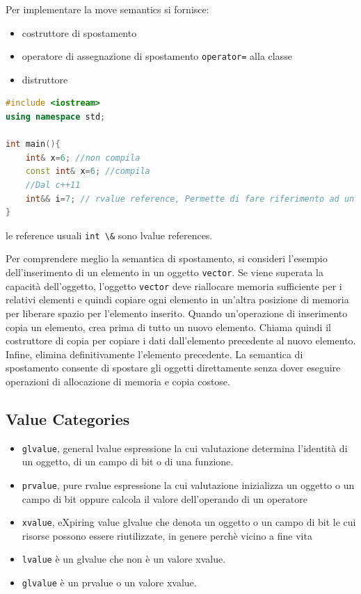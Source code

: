 Per implementare la move semantics si fornisce:
\begin{itemize}
    \item costruttore di spostamento
    \item operatore di assegnazione di spostamento \verb|operator=| alla classe
    \item distruttore
\end{itemize}

\begin{lstlisting}[language=C++]
#include <iostream>
using namespace std;

int main(){
    int& x=6; //non compila
    const int& x=6; //compila
    //Dal c++11
    int&& i=7; // rvalue reference, Permette di fare riferimento ad un rvalue e di modificarlo
}
\end{lstlisting}
le reference usuali \verb|int \&| sono lvalue references.

Per comprendere meglio la semantica di spostamento, si consideri l'esempio dell'inserimento di un elemento in un oggetto \verb|vector|. Se viene superata la capacità dell'oggetto, l'oggetto \verb|vector| deve riallocare memoria sufficiente per i relativi elementi e quindi copiare ogni elemento in un'altra posizione di memoria per liberare spazio per l'elemento inserito. Quando un'operazione di inserimento copia un elemento, crea prima di tutto un nuovo elemento. Chiama quindi il costruttore di copia per copiare i dati dall'elemento precedente al nuovo elemento. Infine, elimina definitivamente l'elemento precedente. La semantica di spostamento consente di spostare gli oggetti direttamente senza dover eseguire operazioni di allocazione di memoria e copia costose.


\subsection{Value Categories}

\begin{itemize}
    \item \verb|glvalue|, general lvalue espressione la cui valutazione determina l'identità di un oggetto, di un campo di bit o di una funzione.
    \item \verb|prvalue|, pure rvalue espressione la cui valutazione inizializza un oggetto o un campo di bit oppure calcola il valore dell'operando di un operatore
    \item \verb|xvalue|, eXpiring value glvalue che denota un oggetto o un campo di bit le cui risorse possono essere riutilizzate, in genere perchè vicino a fine vita
    \item \verb|lvalue| è un glvalue che non è un valore xvalue.
    \item \verb|glvalue| è un prvalue o un valore xvalue.
\end{itemize}

